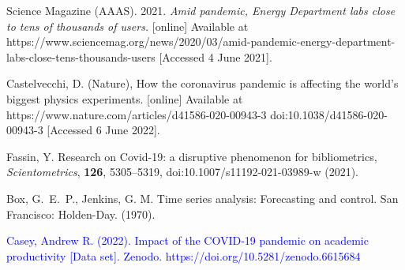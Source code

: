 \documentclass[]{rsos}%
\newcommand{\add}[1]{\textcolor{blue}{#1}}
\begin{document}
\begin{thebibliography}{10}
Science Magazine (AAAS). 2021. \emph{Amid pandemic, Energy Department labs close to tens of thousands of users.} [online] Available at {https://www.sciencemag.org/news/2020/03/amid-pandemic-energy-department-labs-close-tens-thousands-users} [Accessed 4 June 2021].

Castelvecchi, D. (Nature), {How the coronavirus pandemic is affecting the world's biggest physics experiments.} [online] Available at {https://www.nature.com/articles/d41586-020-00943-3} doi:10.1038/d41586-020-00943-3 [Accessed 6 June 2022].

{Fassin, Y.} {Research on Covid-19: a disruptive phenomenon for bibliometrics}, \emph{Scientometrics}, \textbf{126}, 5305--5319, doi:10.1007/s11192-021-03989-w \newblock (2021).

{Box, G.~E.~P., Jenkins, G. M.} Time series analysis: Forecasting and control. San Francisco: Holden-Day. \newblock (1970).

\add{ Casey, Andrew R. (2022). Impact of the COVID-19 pandemic on academic productivity [Data set]. Zenodo. https://doi.org/10.5281/zenodo.6615684}

\end{thebibliography}
\end{document}

